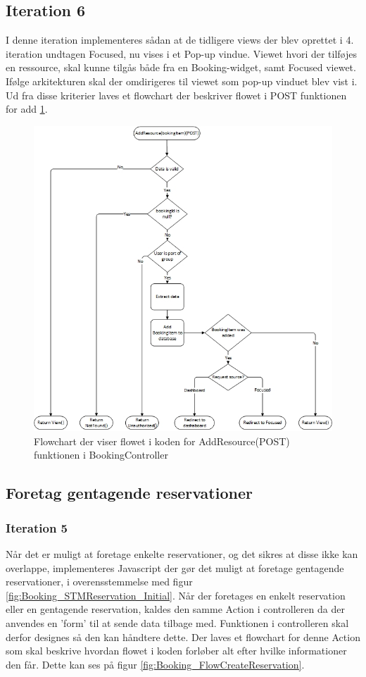 \subsection{Iteration 6}
I denne iteration implementeres sådan at de tidligere views der blev oprettet i 4. iteration undtagen Focused, nu vises i et Pop-up vindue. Viewet hvori der tilføjes en ressource, skal kunne tilgås både fra en Booking-widget, samt Focused viewet. Ifølge arkitekturen skal der omdirigeres til viewet som pop-up vinduet blev vist i. Ud fra disse kriterier laves et flowchart der beskriver flowet i POST funktionen for add \ref{fig:Flowchart_AddResource}.   

\begin{figure}[H]
  \includegraphics[width=0.9\linewidth]{01_Billeder/10_Design_og_implementering/Booking/Flow_AddResource.jpg}
  \centering
  \caption{Flowchart der viser flowet i koden for AddResource(POST) funktionen i BookingController}
  \label{fig:Flowchart_AddResource}
\end{figure}


\subsection{Foretag gentagende reservationer}
\subsubsection{Iteration 5}
Når det er muligt at foretage enkelte reservationer, og det sikres at disse ikke kan overlappe, implementeres Javascript der gør det muligt at foretage gentagende reservationer, i overensstemmelse med figur \ref{fig:Booking_STMReservation_Initial}. Når der foretages en enkelt reservation eller en gentagende reservation, kaldes den samme Action i controlleren da der anvendes en 'form' til at sende data tilbage med. Funktionen i controlleren skal derfor designes så den kan håndtere dette. Der laves et flowchart for denne Action som skal beskrive hvordan flowet i koden forløber alt efter hvilke informationer den får. Dette kan ses på figur \ref{fig:Booking_FlowCreateReservation}. 

